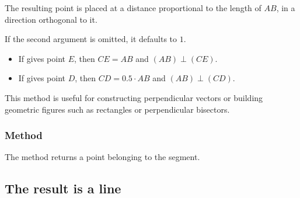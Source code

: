The resulting point is placed at a distance proportional to the length of $AB$, in a direction orthogonal to it.

\medskip
\noindent
If the second argument  is omitted, it defaults to $1$.

\medskip
\noindent
{}
\begin{itemize}
  \item If  gives point $E$, then $CE = AB$ and $(AB) \perp (CE)$.
  \item If  gives point $D$, then $CD = 0.5 \cdot AB$ and $(AB) \perp (CD)$.
\end{itemize}

\noindent
This method is useful for constructing perpendicular vectors or building geometric figures such as rectangles or perpendicular bisectors.

\vspace{1em}
\begin{minipage}{.5\textwidth}
\begin{center}
\end{center}
\end{minipage}
\begin{minipage}{.5\textwidth}
\begin{tkzexample}
\end{tkzexample}
\end{minipage}

\subsubsection{Method }
\label{ssub:method_line_random}
The method returns a point belonging to the segment.

\subsection{The result is a line}


